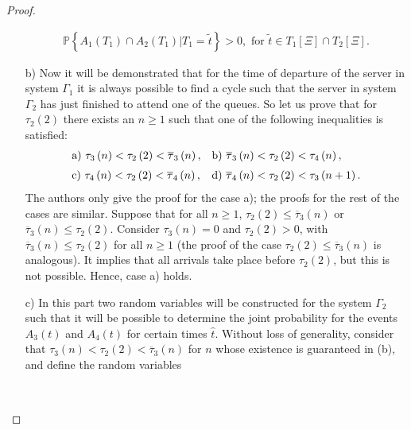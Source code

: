 \documentclass{article}
\newcommand{\prob}{\mathbb{P}}
\begin{document}
\begin{proof}
\begin{itemize}
\begin{eqnarray}
\prob\left\{A_{1}\left(T_{1}\right)\cap A_{2}\left(T_{1}\right)|T_{1}=\tilde{t}\right\}>0,\textrm{ for }\tilde{t}\in T_{1}\left[\Xi\right]\cap T_{2}\left[\Xi\right].
\end{eqnarray}
\item[b) ] Now it will be demonstrated that for the time of departure of the server in system $\Gamma_{1}$ it is always possible to find a cycle such that the server in system $\Gamma_{2}$ has just finished to attend one of the queues. So let us prove that for $\tau_{2}\left(2\right)$ there exists an $n\geq1$ such that one of the following inequalities is satisfied:
\begin{eqnarray}\label{Eq.Casos.Ciclos}
\begin{array}{ll}\medskip
\textrm{a) }\tau_{3}\left(n\right)<\tau_{2}\left(2\right)
<\overline{\tau}_{3}\left(n\right),&
\textrm{b) }\overline{\tau}_{3}\left(n\right)<\tau_{2}\left(2\right)
<\tau_{4}\left(n\right),\\
\textrm{c) }\tau_{4}\left(n\right)<\tau_{2}\left(2\right)<
\overline{\tau}_{4}\left(n\right), &
\textrm{d) }\overline{\tau}_{4}\left(n\right)<\tau_{2}\left(2\right)
<\tau_{3}\left(n+1\right).
\end{array}
\end{eqnarray}
The authors only give the proof for the case a); the proofs for the rest of the cases are similar. 
Suppose that for all $n\geq1$, $\tau_{2}\left(2\right)\leq\overline{\tau}_{3}\left(n\right)$ or $\overline{\tau}_{3}\left(n\right)\leq\tau_{2}\left(2\right)$. Consider $\tau_{3}\left(n\right)=0$ and $\tau_{2}\left(2\right)>0$, with $\overline{\tau}_{3}\left(n\right)\leq\tau_{2}\left(2\right)$ for all $n\geq1$ (the proof of the case $\tau_{2}\left(2\right)\leq\overline{\tau}_{3}\left(n\right)$ is analogous). It implies that all arrivals take place before $\tau_{2}\left(2\right)$, but this is not possible. Hence, case a) holds.\medskip
\item[c) ] In this part two random variables will be constructed for the system $\Gamma_{2}$ such that it will be possible to determine the joint probability for the events $A_{3}\left(t\right)$ and $A_{4}\left(t\right)$ for certain times $\hat{t}$. Without loss of generality, consider that $\tau_{3}\left(n\right)<\tau_{2}\left(2\right)<\overline{\tau}_{3}\left(n\right)$ for $n$ whose existence is guaranteed in (b), and define the random variables
\begin{eqnarray}
\begin{array}{l}\medskip

\end{array}
\end{eqnarray}
\end{itemize}
\end{proof}
\end{document}
